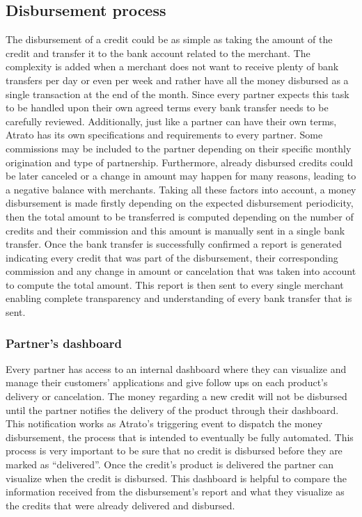 \subsection{Disbursement process}
The disbursement of a credit could be as simple as taking the amount of the credit and transfer it to the bank account related to the merchant. The complexity is added when a merchant does not want to receive plenty of bank transfers per day or even per week and rather have all the money disbursed as a single transaction at the end of the month. Since every partner expects this task to be handled upon their own agreed terms every bank transfer needs to be carefully reviewed. Additionally, just like a partner can have their own terms, Atrato has its own specifications and requirements to every partner. Some commissions may be included to the partner depending on their specific monthly origination and type of partnership. Furthermore, already disbursed credits could be later canceled or a change in amount may happen for many reasons, leading to a negative balance with merchants.
Taking all these factors into account, a money disbursement is made firstly depending on the expected disbursement periodicity, then the total amount to be transferred is computed depending on the number of credits and their commission and this amount is manually sent in a single bank transfer.
Once the bank transfer is successfully confirmed a report is generated indicating every credit that was part of the disbursement, their corresponding commission and any change in amount or cancelation that was taken into account to compute the total amount. This report is then sent to every single merchant enabling complete transparency and understanding of every bank transfer that is sent.
\subsubsection{Partner’s dashboard}
Every partner has access to an internal dashboard where they can visualize and manage their customers’ applications and give follow ups on each product’s delivery or cancelation. The money regarding a new credit will not be disbursed until the partner notifies the delivery of the product through their dashboard. This notification works as Atrato’s triggering event to dispatch the money disbursement, the process that is intended to eventually be fully automated. This process is very important to be sure that no credit is disbursed before they are marked as “delivered”. Once the credit’s product is delivered the partner can visualize when the credit is disbursed. This dashboard is helpful to compare the information received from the disbursement’s report and what they visualize as the credits that were already delivered and disbursed.
